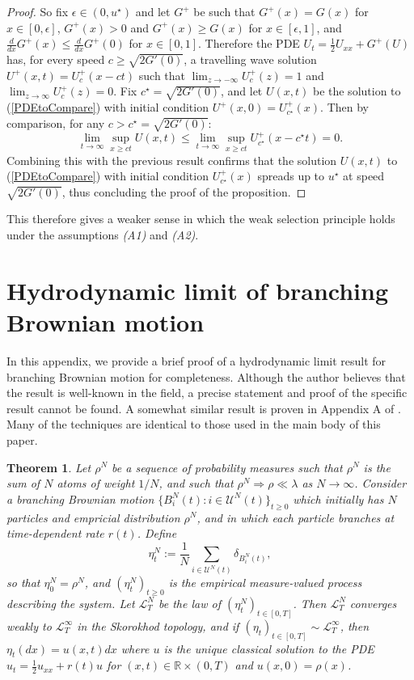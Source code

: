\documentclass{article}
\newtheorem{theorem}{Theorem}
\newcommand{\B}[1]{\mathbb{#1}}
\newcommand{\C}[1]{\mathcal{#1}}
\begin{document}
\begin{proof}
    So fix $\epsilon \in (0,u^\star)$ and let $G^+$ be such that $G^+(x)=G(x)$ for $x\in [0,\epsilon]$, $G^+(x)>0$ and $G^+(x)\geq G(x)
    $ for $x\in [\epsilon, 1]$, and $\frac{d}{dx}G^+(x)\leq \frac{d}{dx}G^+(0)$ for $x\in [0,1]$. Therefore the PDE $U_t = \frac12 U_{xx} + G^+(U)$ has, for every speed $c\geq \sqrt{2G'(0)}$, a travelling wave solution $U^+(x,t)=U^+_c(x-ct)$ such that $\lim_{z\to-\infty}U^+_c(z)=1$ and $\lim_{z\to\infty}U^+_c(z)=0$. Fix $c^\star = \sqrt{2G'(0)}$, and let $U(x,t)$ be the solution to (\ref{PDEtoCompare}) with initial condition $U^+(x,0)=U^+_{c^\star}(x)$. Then by comparison, for any $c>c^\star=\sqrt{2G'(0)}$:
    $$\lim_{t\to\infty}\sup_{x\geq ct}U(x,t) \leq \lim_{t\to\infty}\sup_{x\geq ct}U^+_{c^\star}(x-c^\star t)=0.$$
    Combining this with the previous result confirms that the solution $U(x,t)$ to (\ref{PDEtoCompare}) with initial condition $U^+_{c^\star}(x)$ spreads up to $u^\star$ at speed $\sqrt{2G'(0)}$, thus concluding the proof of the proposition. \end{proof}

    This therefore gives a weaker sense in which the weak selection principle holds under the assumptions \textit{(A1)} and \textit{(A2)}.
    
\appendix
\section{Hydrodynamic limit of branching Brownian motion}
In this appendix, we provide a brief proof of a hydrodynamic limit result for branching Brownian motion for completeness. Although the author believes that the result is well-known in the field, a precise statement and proof of the specific result cannot be found. A somewhat similar result is proven in Appendix A of \cite{beckman}. Many of the techniques are identical to those used in the main body of this paper.

\vspace{1em}

\begin{theorem} \label{bbmHydroAppendix}
    Let $\rho^N$ be a sequence of probability measures such that $\rho^N$ is the sum of $N$ atoms of weight $1/N$, and such that $\rho^N\Rightarrow \rho\ll\lambda$ as $N\to\infty$. Consider a branching Brownian motion $\{B^N_i(t):i\in \C{U}^N(t)\}_{t\geq 0}$ which initially has $N$ particles and empricial distribution $\rho^N$, and in which each particle branches at time-dependent rate $r(t)$. Define
    $$\eta_t^N:=\frac1N\sum_{i\in \C{U}^N(t)}\delta_{B^N_i(t)},$$
    so that $\eta_0^N=\rho^N$, and $(\eta_t^N)_{t\geq 0}$ is the empirical measure-valued process describing the system. Let $\C{L}^N_T$ be the law of $(\eta_t^N)_{t\in [0,T]}$. Then $\C{L}^N_T$ converges weakly to $\C{L}^\infty_T$ in the Skorokhod topology, and if $(\eta_t)_{t\in [0,T]}\sim \C{L}^\infty_T$, then $\eta_t(dx)=u(x,t)dx$ where $u$ is the unique classical solution to the PDE $u_t = \frac12 u_{xx}+ r(t)u$ for $(x,t)\in \B{R}\times (0,T)$ and $u(x,0)=\rho(x)$. 
\end{theorem}
\end{document}
